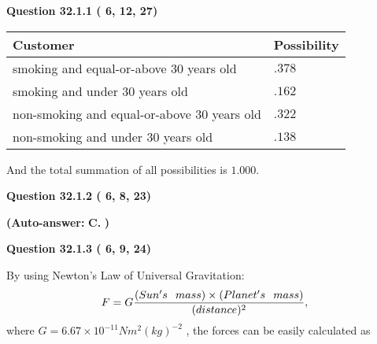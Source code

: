 \documentclass[12pt]{article}
\begin{document}
   
  
  
{\textbf{\large{Question
32.1.1 
 (          6,         12,         27)
}}}

 
\noindent
\begin{tabular}{|l|l|}
\hline
Customer & Possibility \\
\hline
smoking  and  %
equal-or-above 30 years old &
  $ %
.378$ \\
\hline
smoking  and  %
under 30 years old &
  $ %
.162$ \\
\hline
 non-smoking and  %
equal-or-above 30 years old &
  $ %
.322$ \\
\hline
 non-smoking and  %
under 30 years old &
  $ %
.138$ \\
\hline
\end{tabular}
 
\noindent
 And the total summation of all possibilities is $  %
1.000 $.
 
  
  
{\textbf{\large{Question
32.1.2 
 (          6,          8,         23)
}}}
 
 
{\textbf{(Auto-answer:}}
{\textbf{\large{
C.}}}
{\textbf{)}}
 
 
  
  
{\textbf{\large{Question
32.1.3 
 (          6,          9,         24)
}}}

By using Newton's Law of Universal Gravitation:
\[
F=G \frac{(Sun's \hspace{0.1in} mass) \times (Planet's \hspace{0.1in} mass)} { (distance)^2},
\]
where
$ G= %
6.67 \times 10^{-11} N m^{2}(kg)^{-2}$ , the forces can be easily calculated as
 
\vspace{0.2in}
 
\end{document}
